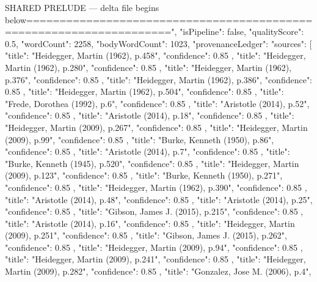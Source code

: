 {SHARED PRELUDE — delta file begins below\n====================================================================",
  "isPipeline": false,
  "qualityScore": 0.5,
  "wordCount": 2258,
  "bodyWordCount": 1023,
  "provenanceLedger": {
    "sources": [
      {
        "title": "Heidegger, Martin (1962), p.458",
        "confidence": 0.85
      },
      {
        "title": "Heidegger, Martin (1962), p.280",
        "confidence": 0.85
      },
      {
        "title": "Heidegger, Martin (1962), p.376",
        "confidence": 0.85
      },
      {
        "title": "Heidegger, Martin (1962), p.386",
        "confidence": 0.85
      },
      {
        "title": "Heidegger, Martin (1962), p.504",
        "confidence": 0.85
      },
      {
        "title": "Frede, Dorothea (1992), p.6",
        "confidence": 0.85
      },
      {
        "title": "Aristotle (2014), p.52",
        "confidence": 0.85
      },
      {
        "title": "Aristotle (2014), p.18",
        "confidence": 0.85
      },
      {
        "title": "Heidegger, Martin (2009), p.267",
        "confidence": 0.85
      },
      {
        "title": "Heidegger, Martin (2009), p.99",
        "confidence": 0.85
      },
      {
        "title": "Burke, Kenneth (1950), p.86",
        "confidence": 0.85
      },
      {
        "title": "Aristotle (2014), p.7",
        "confidence": 0.85
      },
      {
        "title": "Burke, Kenneth (1945), p.520",
        "confidence": 0.85
      },
      {
        "title": "Heidegger, Martin (2009), p.123",
        "confidence": 0.85
      },
      {
        "title": "Burke, Kenneth (1950), p.271",
        "confidence": 0.85
      },
      {
        "title": "Heidegger, Martin (1962), p.390",
        "confidence": 0.85
      },
      {
        "title": "Aristotle (2014), p.48",
        "confidence": 0.85
      },
      {
        "title": "Aristotle (2014), p.25",
        "confidence": 0.85
      },
      {
        "title": "Gibson, James J. (2015), p.215",
        "confidence": 0.85
      },
      {
        "title": "Aristotle (2014), p.16",
        "confidence": 0.85
      },
      {
        "title": "Heidegger, Martin (2009), p.251",
        "confidence": 0.85
      },
      {
        "title": "Gibson, James J. (2015), p.262",
        "confidence": 0.85
      },
      {
        "title": "Heidegger, Martin (2009), p.94",
        "confidence": 0.85
      },
      {
        "title": "Heidegger, Martin (2009), p.241",
        "confidence": 0.85
      },
      {
        "title": "Heidegger, Martin (2009), p.282",
        "confidence": 0.85
      },
      {
        "title": "Gonzalez, Jose M. (2006), p.4",
}}}
